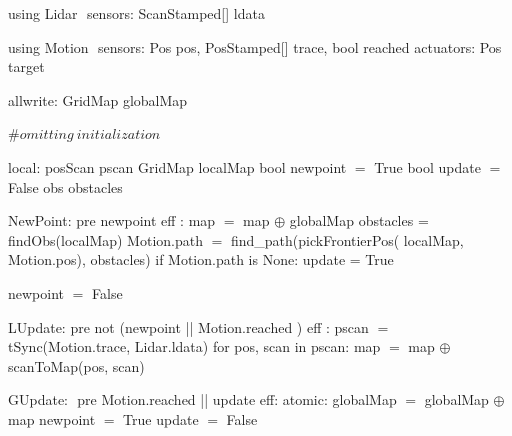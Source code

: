 using Lidar $\label{lidardef}$
    sensors:
       ScanStamped[] ldata

using Motion $\label{moddef}$
    sensors:
        Pos pos,
        PosStamped[] trace,
        bool reached
    actuators:
        Pos target

allwrite:$\label{awvar}$
    GridMap globalMap

#$\mathit{omitting\ initialization}$

local:
   posScan pscan
   GridMap localMap
   bool newpoint $=$ True
   bool update  $=$ False
   obs obstacles

NewPoint:$\label{newpt}$
  pre newpoint
  eff : map $=$ map $\oplus$ globalMap
        obstacles = findObs(localMap)
        Motion.path $=$ find_path(pickFrontierPos(
                              localMap, Motion.pos), obstacles)
        if Motion.path is None:
           update = True

        newpoint $=$ False

LUpdate:$\label{lup}$
   pre not (newpoint || Motion.reached )
   eff : pscan $=$ tSync(Motion.trace, Lidar.ldata)
         for pos, scan in pscan:
             map $=$ map $\oplus$ scanToMap(pos, scan)

GUpdate: $\label{gup}$
  pre Motion.reached || update
  eff: atomic:
           globalMap $=$ globalMap $\oplus$ map
        newpoint $=$ True
        update $=$ False